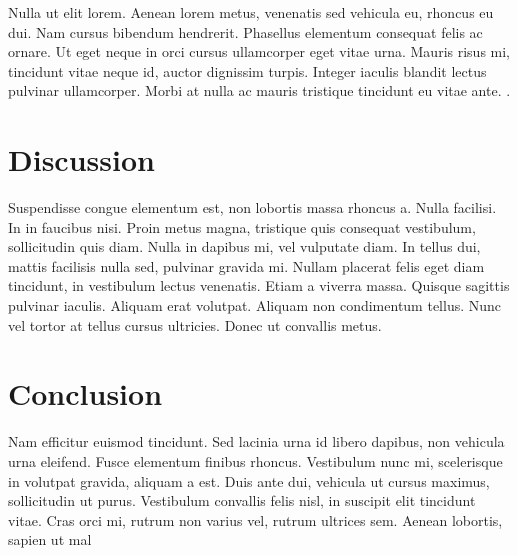 Nulla ut elit lorem. Aenean lorem metus, venenatis sed vehicula eu, rhoncus eu dui. Nam cursus bibendum hendrerit. Phasellus elementum consequat felis ac ornare. Ut eget neque in orci cursus ullamcorper eget vitae urna. Mauris risus mi, tincidunt vitae neque id, auctor dignissim turpis. Integer iaculis blandit lectus pulvinar ullamcorper. Morbi at nulla ac mauris tristique tincidunt eu vitae ante. .



\section{Discussion}

Suspendisse congue elementum est, non lobortis massa rhoncus a. Nulla facilisi. In in faucibus nisi. Proin metus magna, tristique quis consequat vestibulum, sollicitudin quis diam. Nulla in dapibus mi, vel vulputate diam. In tellus dui, mattis facilisis nulla sed, pulvinar gravida mi. Nullam placerat felis eget diam tincidunt, in vestibulum lectus venenatis. Etiam a viverra massa. Quisque sagittis pulvinar iaculis. Aliquam erat volutpat. Aliquam non condimentum tellus. Nunc vel tortor at tellus cursus ultricies. Donec ut convallis metus.


\section{Conclusion}

Nam efficitur euismod tincidunt. Sed lacinia urna id libero dapibus, non vehicula urna eleifend. Fusce elementum finibus rhoncus. Vestibulum nunc mi, scelerisque in volutpat gravida, aliquam a est. Duis ante dui, vehicula ut cursus maximus, sollicitudin ut purus. Vestibulum convallis felis nisl, in suscipit elit tincidunt vitae. Cras orci mi, rutrum non varius vel, rutrum ultrices sem. Aenean lobortis, sapien ut mal
